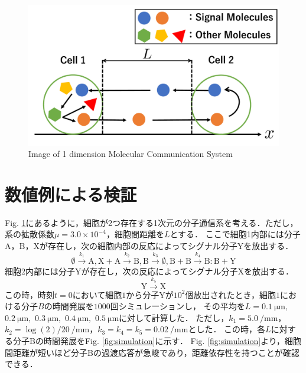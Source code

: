 \documentclass[twocolumn]{jarticle}
\begin{document}

\begin{figure}[tb]
    \centering
    \includegraphics[width=\columnwidth] {figures/Images.pdf}
    \caption{Image of 1 dimension Molecular Communication System}
    \label{fig:image}
\end{figure}


\section{数値例による検証}
Fig. \ref{fig:image}にあるように，細胞が2つ存在する1次元の分子通信系を考える．ただし，系の拡散係数$\mu=$$3.0\times10^{-4}$，細胞間距離を$L$とする．
ここで細胞1内部には分子$\mathrm{A}$，$\mathrm{B}$，$\mathrm{X}$が存在し，次の細胞内部の反応によってシグナル分子$\mathrm{Y}$を放出する．
\begin{equation}
    \emptyset \xrightarrow{k_1} \mathrm{A},\mathrm{X}+\mathrm{A} \xrightarrow{k_2} \mathrm{B}, \mathrm{B} \xrightarrow{k_3} \emptyset, \mathrm{B}+\mathrm{B}\xrightarrow{k_4} \mathrm{B:B} +\mathrm{Y}
\end{equation}
細胞2内部には分子$\mathrm{Y}$が存在し，次の反応によってシグナル分子$\mathrm{X}$を放出する．
\begin{equation}
    \mathrm{Y} \xrightarrow{k_5} \mathrm{X}
\end{equation}
この時，時刻$t=0$において細胞$1$から分子$\mathrm{Y}$が$10^2$個放出されたとき，細胞$1$における分子$B$の時間発展を$1000$回シミュレーションし，
その平均を$L=\SI{0.1}{\um},$ $\SI{0.2}{\um},$ $\SI{0.3}{\um},$ $\SI{0.4}{\um},$ $\SI{0.5}{\um}$に対して計算した．
ただし，$k_1 = \SI{5.0}{\per\mm}$，$k_2 = \log(2)/20\ \si{\per\mm}$，$k_3=k_4=k_5=\SI{0.02}{\per\mm}$とした．
この時，各$L$に対する分子Bの時間発展をFig. \ref{fig:simulation}に示す．
Fig. \ref{fig:simulation}より，細胞間距離が短いほど分子Bの過渡応答が急峻であり，距離依存性を持つことが確認できる．
\end{document}

